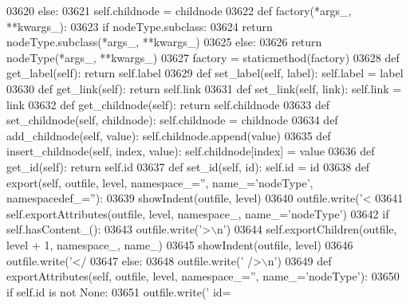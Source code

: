 \begin{DoxyCode}
{{{{{{{{{{{{{{{{{{{{{{{{{{{{{{{{{{{{{{{{{{{{{{{{{{{{{{{{{{{{{{{{{{{{{{{{{{{{{{{{{{{{{{{{{{{{{{{{{{{{{{{{{{{{{{{{{{{{{{{{{{{{{{{{{{{{{{{{{{{{{{{{{{{{{{{{{{{{{{{{{{{{{{{{{{{{{{{{{{{{{{{{{{{{{{{{{{{{{{{{{{{{{{{{{{{{{{{{{{{{{{{{{{{{{{{{03620         \textcolor{keywordflow}{else}:
03621             self.childnode = childnode
03622     \textcolor{keyword}{def }factory(*args\_, **kwargs\_):
03623         \textcolor{keywordflow}{if} nodeType.subclass:
03624             \textcolor{keywordflow}{return} nodeType.subclass(*args\_, **kwargs\_)
03625         \textcolor{keywordflow}{else}:
03626             \textcolor{keywordflow}{return} nodeType(*args\_, **kwargs\_)
03627     factory = staticmethod(factory)
03628     \textcolor{keyword}{def }get_label(self): \textcolor{keywordflow}{return} self.label
03629     \textcolor{keyword}{def }set_label(self, label): self.label = label
03630     \textcolor{keyword}{def }get_link(self): \textcolor{keywordflow}{return} self.link
03631     \textcolor{keyword}{def }set_link(self, link): self.link = link
03632     \textcolor{keyword}{def }get_childnode(self): \textcolor{keywordflow}{return} self.childnode
03633     \textcolor{keyword}{def }set_childnode(self, childnode): self.childnode = childnode
03634     \textcolor{keyword}{def }add_childnode(self, value): self.childnode.append(value)
03635     \textcolor{keyword}{def }insert_childnode(self, index, value): self.childnode[index] = value
03636     \textcolor{keyword}{def }get_id(self): \textcolor{keywordflow}{return} self.id
03637     \textcolor{keyword}{def }set_id(self, id): self.id = id
03638     \textcolor{keyword}{def }export(self, outfile, level, namespace\_='', name\_='nodeType', namespacedef\_=''):
03639         showIndent(outfile, level)
03640         outfile.write(\textcolor{stringliteral}{'<%
03641         self.exportAttributes(outfile, level, namespace\_, name\_=\textcolor{stringliteral}{'nodeType'})
03642         \textcolor{keywordflow}{if} self.hasContent_():
03643             outfile.write(\textcolor{stringliteral}{'>\(\backslash\)n'})
03644             self.exportChildren(outfile, level + 1, namespace\_, name\_)
03645             showIndent(outfile, level)
03646             outfile.write(\textcolor{stringliteral}{'</%
03647         \textcolor{keywordflow}{else}:
03648             outfile.write(\textcolor{stringliteral}{' />\(\backslash\)n'})
03649     \textcolor{keyword}{def }exportAttributes(self, outfile, level, namespace\_='', name\_='nodeType'):
03650         \textcolor{keywordflow}{if} self.id \textcolor{keywordflow}{is} \textcolor{keywordflow}{not} \textcolor{keywordtype}{None}:
03651             outfile.write(\textcolor{stringliteral}{' id=%
}}}}}}}}}}}}}}}}}}}}}}}}}}}}}}}}}}}}}}}}}}}}}}}}}}}}}}}}}}}}}}}}}}}}}}}}}}}}}}}}}}}}}}}}}}}}}}}}}}}}}}}}}}}}}}}}}}}}}}}}}}}}}}}}}}}}}}}}}}}}}}}}}}}}}}}}}}}}}}}}}}}}}}}}}}}}}}}}}}}}}}}}}}}}}}}}}}}}}}}}}}}}}}}}}}}}}}}}}}}}}}}}}}}}}}}}}}}
\end{DoxyCode}
